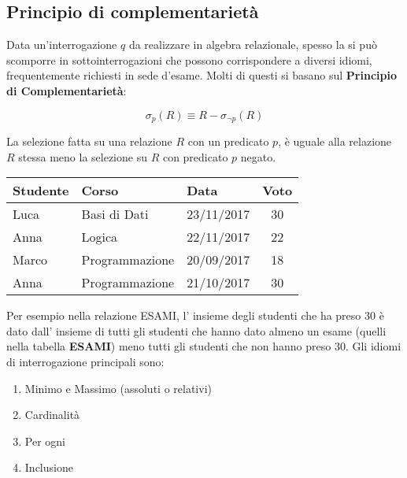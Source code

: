 \subsection{Principio di complementarietà}

Data un'interrogazione $q$ da realizzare in algebra relazionale, spesso la si può
scomporre in sottointerrogazioni che possono corrispondere a diversi idiomi,
frequentemente richiesti in sede d'esame. Molti di questi si basano sul \textbf{Principio di Complementarietà}:

\begin{displaymath}
  \sigma_{p}(R) \equiv R - \sigma_{\neg{p}}(R)
\end{displaymath}

La selezione fatta su una relazione $R$ con un predicato $p$, è uguale alla relazione $R$
stessa meno la selezione su $R$ con predicato $p$ negato.

\begin{center}
  \begin{tabular}{ | l | l | l | c |}
    \hline
      \textbf{Studente} & \textbf{Corso} & \textbf{Data} & \textbf{Voto} \\ \hline
      Luca & Basi di Dati & 23/11/2017 & 30 \\ \hline
      Anna & Logica & 22/11/2017 & 22 \\ \hline
      Marco & Programmazione & 20/09/2017 & 18 \\ \hline
      Anna & Programmazione & 21/10/2017 & 30 \\
    \hline
  \end{tabular}
\end{center}

Per esempio nella relazione ESAMI, l’ insieme degli studenti che ha preso 30 è dato
dall’ insieme di tutti gli studenti che hanno dato almeno un esame (quelli nella tabella
\textbf{ESAMI}) meno tutti gli studenti che non hanno preso 30. Gli idiomi di interrogazione
principali sono:

\begin{enumerate}
  \item Minimo e Massimo (assoluti o relativi)
  \item Cardinalità
  \item Per ogni
  \item Inclusione
\end{enumerate}
